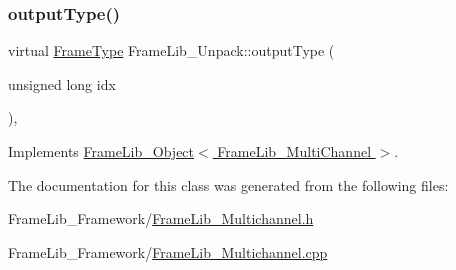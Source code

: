 \subsubsection{\texorpdfstring{output\+Type()}{outputType()}}
{\footnotesize\ttfamily virtual \hyperlink{_frame_lib___types_8h_ad495a9f61af7fff07d7e97979d1ab854}{Frame\+Type} Frame\+Lib\+\_\+\+Unpack\+::output\+Type (\begin{DoxyParamCaption}\item[{unsigned long}]{idx }\end{DoxyParamCaption})\hspace{0.3cm}{\ttfamily [inline]}, {\ttfamily [virtual]}}



Implements \hyperlink{class_frame_lib___object_abdfca6b259f5fc7f97f4f2e016c1d80f}{Frame\+Lib\+\_\+\+Object$<$ Frame\+Lib\+\_\+\+Multi\+Channel $>$}.



The documentation for this class was generated from the following files\+:\begin{DoxyCompactItemize}
\item 
Frame\+Lib\+\_\+\+Framework/\hyperlink{_frame_lib___multichannel_8h}{Frame\+Lib\+\_\+\+Multichannel.\+h}\item 
Frame\+Lib\+\_\+\+Framework/\hyperlink{_frame_lib___multichannel_8cpp}{Frame\+Lib\+\_\+\+Multichannel.\+cpp}\end{DoxyCompactItemize}
